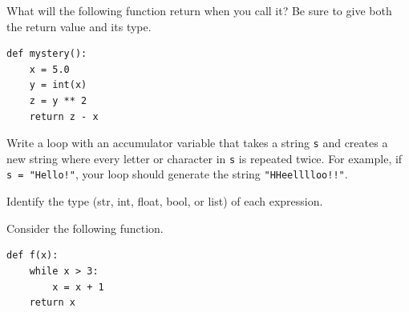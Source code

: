 \documentclass[12pt]{exam}
\begin{document}
\begin{questions}
\question[8] What will the following function return when you call it? Be sure to give both the return value and its type.
\begin{lstlisting}
def mystery():
    x = 5.0
    y = int(x)
    z = y ** 2
    return z - x
\end{lstlisting}
\vfill

\question[12] Write a loop with an accumulator variable that takes a string \lstinline{s} and creates a new string where every letter or character in \lstinline{s} is repeated twice.  For example, if \lstinline{s = "Hello!"}, your loop should generate the string \lstinline{"HHeelllloo!!"}.
\vspace*{2.5in}
\vfill

\newpage

\question[10] Identify the type (str, int, float, bool, or list) of each expression.



\question[8] Consider the following function. 

\begin{lstlisting}
def f(x):
    while x > 3:
        x = x + 1
    return x
\end{lstlisting}

\end{questions}
\end{document}
